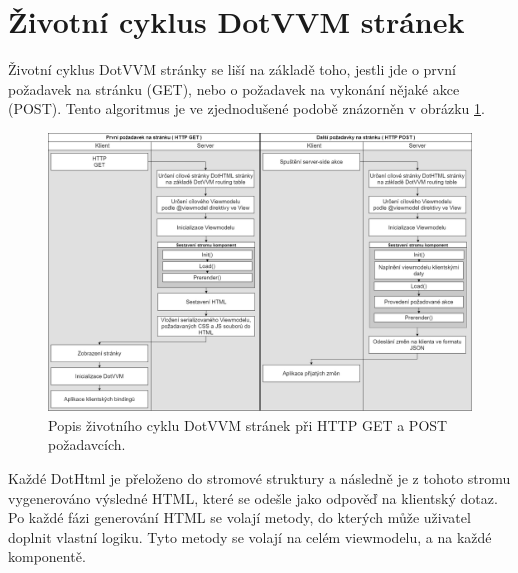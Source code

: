 \section{Životní cyklus DotVVM stránek}
\label{lifecycle}
Životní cyklus DotVVM stránky se liší na základě toho, jestli jde o první požadavek na stránku (GET), nebo o požadavek na vykonání nějaké akce (POST)\cite{DotVVM-VM}. Tento algoritmus je ve zjednodušené podobě znázorněn v obrázku \ref{Get a Post v DotVVM}.
\begin{figure}[hbt]
	\centering
	\includegraphics[width=1\textwidth]{obrazky-figures/DotVVM_lifecycle.png}\hfill
	\caption{Popis životního cyklu DotVVM stránek při HTTP GET a POST požadavcích.}
	\label{Get a Post v DotVVM}
\end{figure}

Každé DotHtml je přeloženo do stromové struktury a následně je z tohoto stromu vygenerováno výsledné HTML, které se odešle jako odpověď na klientský dotaz. Po každé fázi generování HTML se volají metody, do kterých může uživatel doplnit vlastní logiku. Tyto metody se volají na celém viewmodelu, a na každé komponentě.

